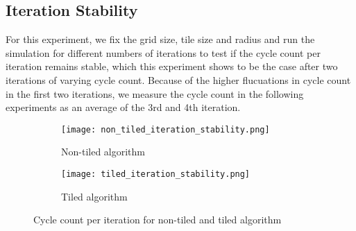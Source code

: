 \subsection{Iteration Stability}
\label{sec:stability_of_cycle_count_per_iteration}
For this experiment, we fix the grid size, tile size and radius and run the simulation for different numbers of iterations to test if the cycle count per iteration remains stable, which this experiment shows to be the case after two iterations of varying cycle count.
Because of the higher flucuations in cycle count in the first two iterations, we measure the cycle count in the following experiments as an average of the 3rd and 4th iteration.
\begin{figure}[h]
    \centering
    \begin{subfigure}[b]{0.48\textwidth}
        \centering
        \texttt{[image: non\_tiled\_iteration\_stability.png]}
        \caption{Non-tiled algorithm}
        \label{fig:non_tiled_iteration_stability}
    \end{subfigure}
    \hfill
    \begin{subfigure}[b]{0.48\textwidth}
        \centering
        \texttt{[image: tiled\_iteration\_stability.png]}
        \caption{Tiled algorithm}
        \label{fig:tiled_iteration_stability}
    \end{subfigure}
    \caption{Cycle count per iteration for non-tiled and tiled algorithm}
    \label{fig:iteration_stability}
\end{figure}

